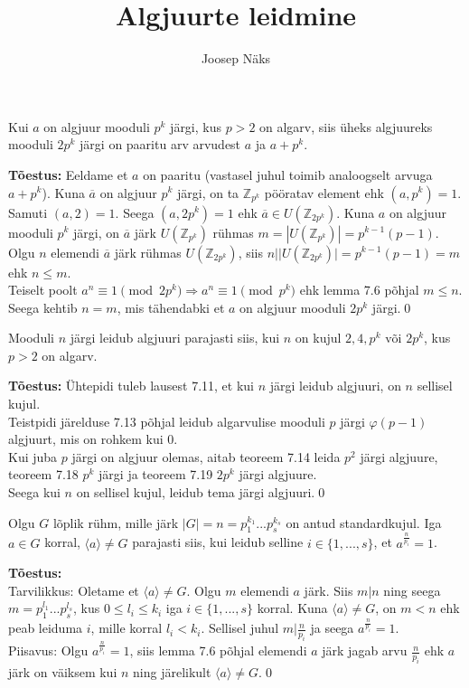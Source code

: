 \documentclass{beamer}
\title{Algjuurte leidmine}
\author{Joosep Näks}
\institute{Tartu Ülikool}
\newcommand{\w}{\overline}
\newcommand{\Z}{\mathbb{Z}}
\begin{document}
\begin{frame} 
\titlepage
\end{frame}

\begin{frame}

\begin{theorem}[Teoreem 7.19]
  Kui $a$ on algjuur mooduli $p^k$ järgi, kus $p>2$ on algarv, siis üheks algjuureks mooduli $2p^k$ järgi on paaritu arv arvudest $a$ ja $a+p^k$.
\end{theorem}
\textbf{Tõestus:} Eeldame et $a$ on paaritu (vastasel juhul toimib analoogselt arvuga $a+p^k$). Kuna $\w{a}$ on algjuur $p^k$ järgi, on ta $\Z_{p^k}$ pööratav element ehk $(a,p^k)=1$. Samuti $(a,2)=1$. Seega $(a,2p^k)=1$ ehk $\w a\in U(\Z_{2p^k})$. Kuna $a$ on algjuur mooduli $p^k$ järgi, on $\w a$ järk $U(\Z_{p^k})$ rühmas $m=|U(\Z_{p^k})|=p^{k-1}(p-1)$. Olgu $n$ elemendi $\w a$ järk rühmas $U(\Z_{2p^k})$, siis $n||U(\Z_{2p^k})|=p^{k-1}(p-1)=m$ ehk $n\leq m$.\\ Teiselt poolt $a^n\equiv1\pmod{2p^k} \Rightarrow a^n\equiv1\pmod{p^k}$ ehk lemma 7.6 põhjal $m\leq n$. Seega kehtib $n=m$, mis tähendabki et $a$ on algjuur mooduli $2p^k$ järgi.\qed
\end{frame}

\begin{frame}
\begin{theorem}[Teoreem 7.21]
Mooduli $n$ järgi leidub algjuuri parajasti siis, kui $n$ on kujul $2, 4, p^k\text{ või } 2p^k$, kus $p>2$ on algarv.
\end{theorem}
\textbf{Tõestus:} Ühtepidi tuleb lausest 7.11, et kui $n$ järgi leidub algjuuri, on $n$ sellisel kujul.\\
Teistpidi järelduse 7.13 põhjal leidub algarvulise mooduli $p$ järgi $\varphi(p-1)$ algjuurt, mis on rohkem kui 0.\\
Kui juba $p$ järgi on algjuur olemas, aitab teoreem 7.14 leida $p^2$ järgi algjuure, teoreem 7.18 $p^k$ järgi ja teoreem 7.19 $2p^k$ järgi algjuure.\\
Seega kui $n$ on sellisel kujul, leidub tema järgi algjuuri.\qed
\end{frame}

\begin{frame}
\begin{theorem}[Teoreem 7.22]
Olgu $G$ lõplik rühm, mille järk $|G|=n=p_1^{k_1}...p_s^{k_s}$ on antud standardkujul. Iga $a\in G$ korral, $\langle a\rangle\neq G$ parajasti siis, kui leidub selline $i\in\{1,...,s\}$, et $a^{\frac{n}{p_i}}=1$.
\end{theorem}
\textbf{Tõestus:}\\ Tarvilikkus: Oletame et $\langle a\rangle\neq G$. Olgu $m$ elemendi $a$ järk. Siis $m|n$ ning seega $m=p_1^{l_1}...p_s^{l_s}$, kus $0\leq l_i\leq k_i$ iga $i\in\{1,...,s\}$ korral. Kuna $\langle a\rangle\neq G$, on $m<n$ ehk peab leiduma $i$, mille korral $l_i<k_i$. Sellisel juhul $m|\frac{n}{p_i}$ ja seega $a^{\frac{n}{p_i}}=1$.\\
Piisavus: Olgu $a^{\frac{n}{p_i}}=1$, siis lemma 7.6 põhjal elemendi $a$ järk jagab arvu $\frac{n}{p_i}$ ehk $a$ järk on väiksem kui $n$ ning järelikult $\langle a\rangle \neq G$.\qed
\end{frame}
\end{document}
